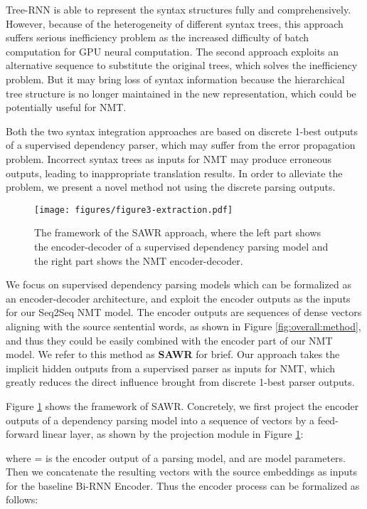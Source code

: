 \documentclass[11pt,a4paper]{article}
\begin{document}
\begin{CJK}{UTF8}{gbsn}
Tree-RNN is able to represent the syntax structures fully and comprehensively.
However, because of the heterogeneity of different syntax trees,
this approach suffers serious inefficiency problem as the increased difficulty
of batch computation for GPU neural computation.
The second approach exploits an alternative sequence to substitute the original trees,
which solves the inefficiency problem.
But it may bring loss of syntax information
because the hierarchical tree structure is no longer maintained in the new representation,
which could be potentially useful for NMT.

Both the two syntax integration approaches are based on discrete 1-best outputs of a supervised dependency parser,
which may suffer from the error propagation problem.
Incorrect syntax trees as inputs for NMT may produce erroneous outputs,
leading to inappropriate translation results.
In order to alleviate the problem,
we present a novel method not using the discrete parsing outputs.


\begin{figure}[tb]
	\centerline{\texttt{[image: figures/figure3-extraction.pdf]}}
	\caption{The framework of the SAWR approach, where the left part shows the encoder-decoder of a supervised dependency parsing model and the right part shows the NMT encoder-decoder.  }\label{model-extractor}
\end{figure}



We focus on supervised dependency parsing models which can be formalized as an encoder-decoder architecture,
and exploit the encoder outputs as the inputs for our Seq2Seq NMT model.
The encoder outputs are sequences of dense vectors aligning with the source sentential words,
as shown in Figure \ref{fig:overall:method},
and thus they could be easily combined with the encoder part of our NMT model.
We refer to this method as \textbf{SAWR} for brief.
Our approach takes the implicit hidden outputs from a supervised parser as inputs for NMT,
which greatly reduces the direct influence brought from discrete 1-best parser outputs.





Figure \ref{model-extractor} shows the framework of SAWR.
Concretely, we first project the encoder outputs of a dependency parsing model
into a sequence of vectors by a feed-forward linear layer,
as shown by the projection module in Figure \ref{model-extractor}:

where = is the encoder output of a parsing model,
 and  are model parameters.
Then we concatenate the resulting vectors with the source embeddings as inputs for the baseline Bi-RNN Encoder.
Thus the encoder process can be formalized as follows:



\end{CJK}
\end{document}
